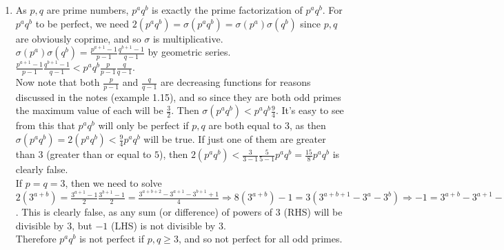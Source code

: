 \documentclass[10pt,english]{article}
\begin{document}
\begin{enumerate}
\pagebreak
\item As $p,q$ are prime numbers, $p^aq^b$ is exactly the prime factorization of $p^aq^b$. For $p^aq^b$ to be perfect, we need $2(p^aq^b)=\sigma(p^aq^b)=\sigma(p^a)\sigma(q^b)$ since $p,q$ are obviously coprime, and so $\sigma$ is multiplicative. $\sigma(p^a)\sigma(q^b)=\frac{p^{a+1}-1}{p-1}\frac{q^{b+1}-1}{q-1}$ by geometric series. $\frac{p^{a+1}-1}{p-1}\frac{q^{b+1}-1}{q-1}<p^aq^b\frac{p}{p-1}\frac{q}{q-1}$. \\ 
Now note that both $\frac{p}{p-1}$ and $\frac{q}{q-1}$ are decreasing functions for reasons discussed in the notes (example 1.15), and so since they are both odd primes the maximum value of each will be $\frac{3}{2}$. Then $\sigma(p^aq^b)<p^aq^b\frac{9}{4}$. It's easy to see from this that $p^aq^b$ will only be perfect if $p,q$ are both equal to $3$, as then $\sigma(p^aq^b)=2(p^aq^b)<\frac{9}{4}p^aq^b$ will be true. If just one of them are greater than $3$ (greater than or equal to $5$), then $2(p^aq^b)<\frac{3}{3-1}\frac{5}{5-1}p^aq^b=\frac{15}{8}p^aq^b$ is clearly false. \\
If $p=q=3$, then we need to solve $2(3^{a+b})=\frac{3^{a+1}-1}{2}\frac{3^{b+1}-1}{2}=\frac{3^{a+b+2}-3^{a+1}-3^{b+1}+1}{4}\Rightarrow 8(3^{a+b})-1=3(3^{a+b+1}-3^a-3^b)\Rightarrow-1=3^{a+b}-3^{a+1}-3^{b+1}$. This is clearly false, as any sum (or difference) of powers of 3 (RHS) will be divisible by $3$, but $-1$ (LHS) is not divisible by $3$.\\
Therefore $p^aq^b$ is not perfect if $p,q\geq3$, and so not perfect for all odd primes. 



\end{enumerate}
\end{document}
